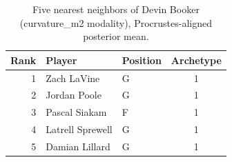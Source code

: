 \begin{table}[htbp]
  \centering\small
  \begin{tabular}{rllc}
    \toprule
    Rank & Player & Position & Archetype \\
    \midrule
    1 & Zach LaVine & G & 1 \\
    2 & Jordan Poole & G & 1 \\
    3 & Pascal Siakam & F & 1 \\
    4 & Latrell Sprewell & G & 1 \\
    5 & Damian Lillard & G & 1 \\
    \bottomrule
  \end{tabular}
  \caption{Five nearest neighbors of Devin Booker (curvature_m2 modality), Procrustes-aligned posterior mean.}
  \label{tab:Devin_Booker_neighbors_curvature_m2}
\end{table}


